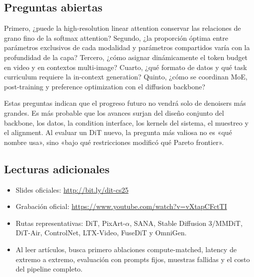 \subsection{Preguntas abiertas}

Primero, ¿puede la high-resolution linear attention conservar las relaciones de grano fino de la softmax attention? Segundo, ¿la proporción óptima entre parámetros exclusivos de cada modalidad y parámetros compartidos varía con la profundidad de la capa? Tercero, ¿cómo asignar dinámicamente el token budget en video y en contextos multi-image? Cuarto, ¿qué formato de datos y qué task curriculum requiere la in-context generation? Quinto, ¿cómo se coordinan MoE, post-training y preference optimization con el diffusion backbone?

Estas preguntas indican que el progreso futuro no vendrá solo de denoisers más grandes. Es más probable que los avances surjan del diseño conjunto del backbone, los datos, la condition interface, los kernels del sistema, el muestreo y el alignment. Al evaluar un DiT nuevo, la pregunta más valiosa no es «qué nombre usa», sino «bajo qué restricciones modificó qué Pareto frontier».

\subsection{Lecturas adicionales}

\begin{itemize}[itemsep=0.2em,topsep=0.2em]
  \item Slides oficiales: \url{http://bit.ly/dit-cs25}
  \item Grabación oficial: \url{https://www.youtube.com/watch?v=vXtapCFctTI}
  \item Rutas representativas: DiT, PixArt-$\alpha$, SANA, Stable Diffusion 3/MMDiT, DiT-Air, ControlNet, LTX-Video, FuseDiT y OmniGen.
  \item Al leer artículos, busca primero ablaciones compute-matched, latency de extremo a extremo, evaluación con prompts fijos, muestras fallidas y el costo del pipeline completo.
\end{itemize}


